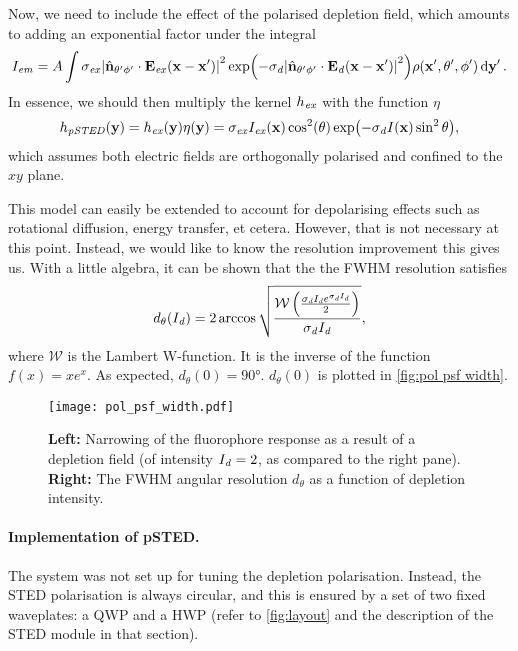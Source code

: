 Now, we need to include the effect of the polarised depletion field, which amounts to adding an exponential factor under the integral
\begin{equation}
	I_{\mathit{em}} = A \int
		\sigma_{\mathit{ex}} \abs{\hat{\vb{n}}_{\theta'\phi'} \cdot \vb{E}_{\mathit{ex}}(\vb{x}-\vb{x}')}^2  
		\exp(-\sigma_{\mathit{d}} \abs{\hat{\vb{n}}_{\theta'\phi'} \cdot \vb{E}_{\mathit{d}}(\vb{x}-\vb{x}')}^2)
		\rho(\vb{x}', \theta', \phi') 
		\dd{\vb{y}'}.
	\label{eq:psted integral}
\end{equation}
In essence, we should then multiply the kernel $ h_{\mathit{ex}} $ with the function $ \eta $
\begin{equation}
	h_\mathit{pSTED}(\vb{y}) = h_{\mathit{ex}}(\vb{y}) \eta(\vb{y}) = \sigma_{\mathit{ex}} I_{\mathit{ex}}(\vb{x}) \cos^2(\theta) \exp(-\sigma_{\mathit{d}} I(\vb{x}) \sin^2 \theta),
\end{equation}
which assumes both electric fields are orthogonally polarised and confined to the $ xy $ plane. 

This model can easily be extended to account for depolarising effects such as rotational diffusion, energy transfer, et cetera. However, that is not necessary at this point. Instead, we would like to know the resolution improvement this gives us. With a little algebra, it can be shown that the the FWHM resolution satisfies
\begin{equation}
	d_\theta(I_{\mathit{d}}) = 2\arccos\sqrt\frac{\mathcal{W}\left(\frac{\sigma_{\mathit{d}} I_{\mathit{d}} e^{\sigma_{\mathit{d}} I_{\mathit{d}}}}{2}\right)}{\sigma_{\mathit{d}} I_{\mathit{d}}},
\end{equation}
where $ \mathcal{W} $ is the Lambert W-function. It is the inverse of the function $ f(x) = xe^x $. As expected, $ d_\theta(0)=\ang{90} $. $ d_\theta(0) $ is plotted in \autoref{fig:pol psf width}.

\begin{figure}
	\centering
	\texttt{[image: pol\_psf\_width.pdf]}
	\caption{
		\textbf{Left:} Narrowing of the fluorophore response as a result of a depletion field (of intensity $ I_{\mathit{d}}=2 $, as compared to the right pane). \textbf{Right:} The FWHM angular resolution $ d_\theta $ as a function of depletion intensity.
	}
	\label{fig:pol psf width}
\end{figure}

\paragraph{Implementation of pSTED.} The system was not set up for tuning the depletion polarisation. Instead, the STED polarisation is always circular, and this is ensured by a set of two fixed waveplates: a QWP and a HWP (refer to \autoref{fig:layout} and the description of the STED module in that section). 

